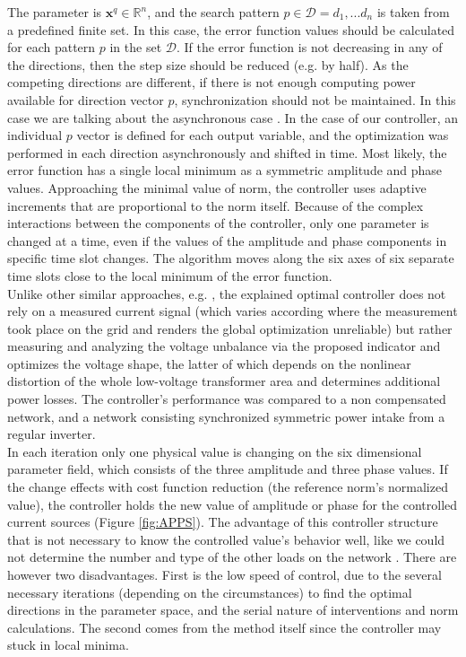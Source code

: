         The parameter is $\textbf{x}^q\in\mathbb{R}^n$, and the search pattern $p\in\mathcal{D}={d_1,...d_n}$ is taken from a predefined finite set. In this case, the error function values should be calculated for each pattern $p$ in the set $\mathcal{D}$. If the error function is not decreasing in any of the directions, then the step size should be reduced (e.g. by half). As the competing directions are different, if there is not enough computing power available for direction vector $p$, synchronization should not be maintained. In this case we are talking about the asynchronous case . In the case of our controller, an individual $p$ vector is defined for each output variable, and the optimization was performed in each direction asynchronously and shifted in time. Most likely, the error function has a single local minimum as a symmetric amplitude and phase values. Approaching the minimal value of norm, the controller uses adaptive increments that are proportional to the norm itself. Because of the complex interactions between the components of the controller, only one parameter is changed at a time, even if the values of the amplitude and phase components in specific time slot changes. The algorithm moves along the six axes of six separate time slots close to the local minimum of the error function.\\
        Unlike other similar approaches, e.g. \cite{segui2007approach}, the explained optimal controller does not rely on a measured current signal (which varies according where the measurement took place on the grid and renders the global optimization unreliable) but rather measuring and analyzing the voltage unbalance via the proposed indicator and optimizes the voltage shape, the latter of which depends on the nonlinear distortion of the whole low-voltage transformer area and determines additional power losses. The controller's performance was compared to a non compensated network, and a network consisting synchronized symmetric power intake from a regular inverter.\\
        In each iteration only one physical value is changing on the six dimensional parameter field, which consists of the three amplitude and three phase values. If the change effects with cost function reduction (the reference norm's normalized value), the controller holds the new value of amplitude or phase for the controlled current sources (Figure \ref{fig:APPS}). The advantage of this controller structure that is not necessary to know the controlled value's behavior well, like we could not determine the number and type of the other loads on the network \cite{Neukirchner2015}. There are however two disadvantages. First is the low speed of control, due to the several necessary iterations (depending on the circumstances) to find the optimal directions in the parameter space, and the serial nature of interventions and norm calculations. The second comes from the method itself since the controller may stuck in local minima.

